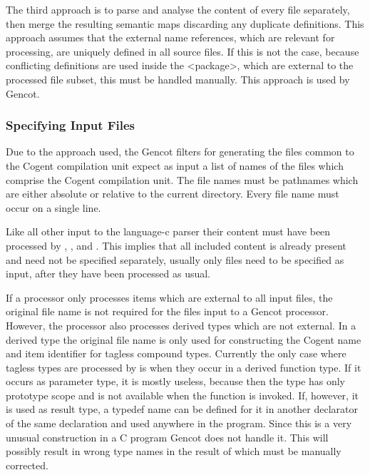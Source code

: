The third approach is to parse and analyse the content of every file separately, then merge the resulting semantic maps
discarding any duplicate definitions. This approach assumes that the external name references, which are relevant for
processing, are uniquely defined in all source files. If this is not the case, because conflicting definitions are used
inside the <package>, which are external to the processed file subset, this must be handled manually. 
This approach is used by Gencot.

\subsubsection{Specifying Input Files}

Due to the approach used, the Gencot filters for generating the files common to the Cogent compilation unit expect
as input a list of names of the files which comprise the Cogent compilation unit. The file names must be pathnames which are either 
absolute or relative to the current directory. Every file name must occur on a single line.

Like all other input to the language-c parser their content must have been processed by , 
, and . This implies that all included content is already present
and need not be specified separately, usually only  files need to be specified as input, after they have
been processed as usual.

If a processor only processes items which are external to all input files, the original file name is not required 
for the files input to a Gencot processor. However, the processor  also processes derived 
types which are not external. In a derived type the original file name is only used for constructing the Cogent name
and item identifier for tagless compound types. Currently the only case where tagless types are processed by 
 is when they occur in a derived function type. If it occurs as parameter type, it is mostly
useless, because then the type has only prototype scope and is not available when the function is invoked. If, however,
it is used as result type, a typedef name can be defined for it in another declarator of the same declaration and
used anywhere in the program. Since this is a very unusual construction in a C program Gencot does not handle it.
This will possibly result in wrong type names in the result of  which must be manually corrected.

